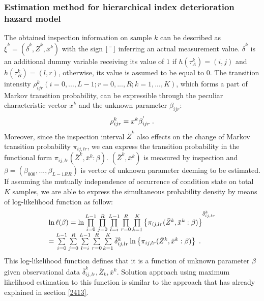 \subsubsection{Estimation method for hierarchical index deterioration hazard model}
\label{2423}
The obtained inspection information on sample $k$ can be described as $\bar\xi^k=(\bar \delta^k,\bar Z^k,\bar x^k)$ with the sign $\left[ {\bar {\hspace{3mm}} } \right]$ inferring an actual measurement value. $\bar \delta^k$ is an additional dummy variable receiving its value of $1$ if $h(\tau_A^k)=(i,j)$ and $h(\tau_B^k)=(l,r)$, otherwise, its value is assumed to be equal to $0$. The transition intensity $\rho_{ijr}^k (i=0,...,L-1;r=0,...,R;k=1,...,K)$, which forms a part of Markov transition probability, can be expressible through the peculiar characteristic vector $x^k$ and the unknown parameter $\beta_{ijr}$:
\begin{eqnarray}
\rho _{ijr}^k  = x^k \beta _{ijr}^{'} \hspace{1mm}.
\end{eqnarray}
Moreover, since the inspection interval $\bar Z^k$ also effects on the change of Markov transition probability $\pi_{ij,lr}$, we can express the transition probability in the functional form $\pi_{ij,lr}(\bar Z^k, \bar x^k: \beta)$. $(\bar Z^k, \bar x^k)$ is measured by inspection and $\beta=(\beta_{000},...,\beta_{L-1RR})$ is vector of unknown parameter deeming to be estimated. If assuming the mutually independence of occurrence of condition state on total $K$ samples, we are able to express the simultaneous probability density by means of log-likelihood function as follow:
\begin{eqnarray}
\begin{array}{l}
 \ln \ell (\beta ) = \ln \prod\limits_{i = 0}^{L - 1} {\prod\limits_{j = 0}^R {\prod\limits_{l = i}^{L - 1} {\prod\limits_{r = 0}^R {\prod\limits_{k = 1}^K {\left\{ {\pi _{ij,lr} (\bar Z^k ,\bar x^k :\beta )} \right\}} } } } } ^{\bar \delta _{ij,lr}^k }  \\ 
  = \sum\limits_{i = 0}^{L - 1} {\sum\limits_{j = 0}^R {\sum\limits_{l = i}^{L - 1} {\sum\limits_{r = 0}^R {\sum\limits_{k = 1}^K {\bar \delta _{ij,lr}^k } } } } } \ln \left\{ {\pi _{ij,lr} (\bar Z^k ,\bar x^k :\beta )} \right\} \hspace{1mm}.\\ 
 \end{array}
\end{eqnarray}
This log-likelihood function defines that it is a function of unknown parameter $\beta$ given observational data $\bar \delta_{ij,lr}^k, \bar Z_k, \bar x^k$. Solution approach using maximum likelihood estimation to this function is similar to the approach that has already explained in section \ref{2413}.

